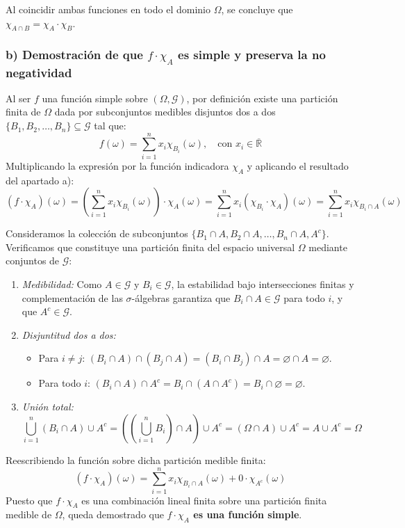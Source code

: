 \begin{problema}
Al coincidir ambas funciones en todo el dominio $\Omega$, se concluye que $\chi_{A \cap B} = \chi_A \cdot \chi_B$.

\subsubsection*{b) Demostración de que $f \cdot \chi_A$ es simple y preserva la no negatividad}
Al ser $f$ una función simple sobre $(\Omega, \mathcal{G})$, por definición existe una partición finita de $\Omega$ dada por subconjuntos medibles disjuntos dos a dos $\{B_1, B_2, \dots, B_n\} \subseteq \mathcal{G}$ tal que:
\[
    f(\omega) = \sum_{i=1}^n x_i \chi_{B_i}(\omega), \quad \text{con } x_i \in \overline{\mathbb{R}}
\]
Multiplicando la expresión por la función indicadora $\chi_A$ y aplicando el resultado del apartado a):
\[
    (f \cdot \chi_A)(\omega) = \left( \sum_{i=1}^n x_i \chi_{B_i}(\omega) \right) \cdot \chi_A(\omega) = \sum_{i=1}^n x_i (\chi_{B_i} \cdot \chi_A)(\omega) = \sum_{i=1}^n x_i \chi_{B_i \cap A}(\omega)
\]

Consideramos la colección de subconjuntos $\{B_1 \cap A, B_2 \cap A, \dots, B_n \cap A, A^c\}$. Verificamos que constituye una partición finita del espacio universal $\Omega$ mediante conjuntos de $\mathcal{G}$:
\begin{enumerate}[label=\arabic*.]
    \item \textit{Medibilidad:} Como $A \in \mathcal{G}$ y $B_i \in \mathcal{G}$, la estabilidad bajo intersecciones finitas y complementación de las $\sigma$-álgebras garantiza que $B_i \cap A \in \mathcal{G}$ para todo $i$, y que $A^c \in \mathcal{G}$.
    \item \textit{Disjuntitud dos a dos:}
    \begin{itemize}
        \item Para $i \neq j$: $(B_i \cap A) \cap (B_j \cap A) = (B_i \cap B_j) \cap A = \varnothing \cap A = \varnothing$.
        \item Para todo $i$: $(B_i \cap A) \cap A^c = B_i \cap (A \cap A^c) = B_i \cap \varnothing = \varnothing$.
    \end{itemize}
    \item \textit{Unión total:}
    \[
        \bigcup_{i=1}^n (B_i \cap A) \cup A^c = \left( \left(\bigcup_{i=1}^n B_i\right) \cap A \right) \cup A^c = (\Omega \cap A) \cup A^c = A \cup A^c = \Omega
    \]
\end{enumerate}

Reescribiendo la función sobre dicha partición medible finita:
\[
    (f \cdot \chi_A)(\omega) = \sum_{i=1}^n x_i \chi_{B_i \cap A}(\omega) + 0 \cdot \chi_{A^c}(\omega)
\]
Puesto que $f \cdot \chi_A$ es una combinación lineal finita sobre una partición finita medible de $\Omega$, queda demostrado que \textbf{$f \cdot \chi_A$ es una función simple}.


\end{problema}
